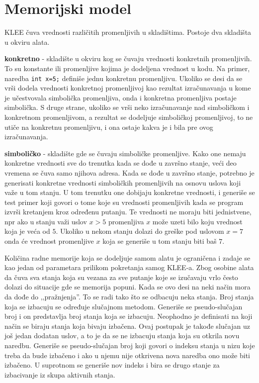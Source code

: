 \documentclass[12pt,oneside]{memoir}
\begin{document}
\section{Memorijski model} \label{memorija}
KLEE čuva vrednosti različitih promenljivih u skladištima. Postoje dva skladišta u okviru alata. 
\begin{description}
    \item \textbf{konkretno} - skladište u okviru kog se čuvaju vrednosti konkretnih promenljivih. To su konstante ili promenljive kojima je dodeljena vrednost u kodu. Na primer, naredba \texttt{int x=5;} definiše jednu konkretnu promenljivu. Ukoliko se desi da se vrši dodela vrednosti konkretnoj promenljivoj kao rezultat izračunavanja u kome je učestvovala simbolička promenljiva, onda i konkretna promenljiva postaje simbolička. S druge strane, ukoliko se vrši neko izračunavanje nad simboličkom i konkretnom promenljivom, a rezultat se dodeljuje simboličkoj promenljivoj, to ne utiče na konkretnu promenljivu, i ona ostaje kakva je i bila pre ovog izračunavanja.
    
    \item \textbf{simboličko} - skladište gde se čuvaju simboličke promenljive. Kako one nemaju konkretne vrednosti sve do trenutka kada se dođe u završno stanje, veći deo vremena se čuva samo njihova adresa. Kada se dođe u završno stanje, potrebno je generisati konkretne vrednosti simboličkih promenljivih na osnovu uslova koji važe u tom stanju. U tom trenutku one dobijaju konkretne vrednosti, i generiše se test primer koji govori o tome koje su vrednosti promenljivih kada se program izvrši kretanjem kroz određenu putanju. Te vrednosti ne moraju biti jednistvene, npr ako u stanju važi uslov $x > 5$ promenljiva $x$ može uzeti bilo koju vrednost koja je veća od $5$. Ukoliko u nekom stanju dolazi do greške pod uslovom $x = 7$ onda će vrednost promenljive $x$ koja se generiše u tom stanju biti baš $7$.
\end{description}
\bigskip
Količina radne memorije koja se dodeljuje samom alatu je ograničena i zadaje se kao jedan od parametara prilikom pokretanja samog KLEE-a. Zbog osobine alata da čuva sva stanja koja su vezana za sve putanje koje se izučavaju vrlo često dolazi do situacije gde se memorija popuni. Kada se ovo desi na neki način mora da dođe do ,,pražnjenja''. To se radi tako što se odbacuju neka stanja. Broj stanja koja se izbacuju se određuje slučajnom metodom. Generiše se pseudo-slučajan broj i on predstavlja broj stanja koja se izbacuju. 
Neophodno je definisati na koji način se biraju stanja koja bivaju izbačena. Ovaj postupak je takođe slučajan uz još jedan dodatan uslov, a to je da se ne izbacuju stanja koja su otkrila novu naredbu. Generiše se pseudo-slučajan broj koji govori o indeksu stanja u nizu koje treba da bude izbačeno i ako u njemu nije otkrivena nova naredba ono može biti izbačeno. U suprotnom se generiše nov indeks i bira se drugo stanje za izbacivanje iz skupa aktivnih stanja.
\end{document}
